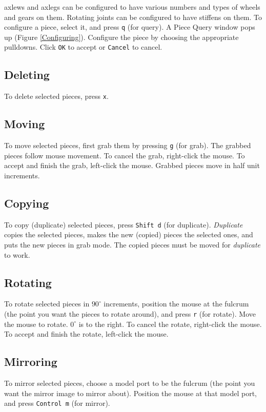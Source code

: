 \documentclass[12pt]{report}
\begin{document}
axlews and axlegs can be configured to have various numbers and types
of wheels and gears on them.  Rotating joints can be configured to
have stiffens on them.  To configure a piece, select it, and press
{\tt q} (for query).  A Piece Query window pops up (Figure
\ref{Configuring}).  Configure the piece by choosing the appropriate
pulldowns.  Click {\tt OK} to accept or {\tt Cancel} to cancel.

\subsection{Deleting}

To delete selected pieces, press {\tt x}.

\subsection{Moving}
To move selected pieces, first grab them by pressing {\tt g} (for
grab).  The grabbed pieces follow mouse movement.  To cancel the grab,
right-click the mouse.  To accept and finish the grab, left-click the
mouse.  Grabbed pieces move in half unit increments.

\subsection{Copying}
To copy (duplicate) selected pieces, press {\tt Shift d} (for
duplicate).  \emph{Duplicate} copies the selected pieces, makes the
new (copied) pieces the selected ones, and puts the new pieces in grab
mode.  The copied pieces must be moved for \emph{duplicate} to work.

\subsection{Rotating}
To rotate selected pieces in $90 ^\circ$ increments, position the
mouse at the fulcrum (the point you want the pieces to rotate around),
and press {\tt r} (for rotate).  Move the mouse to rotate.  $0 ^\circ$
is to the right.  To cancel the rotate, right-click the mouse.  To
accept and finish the rotate, left-click the mouse.

\subsection{Mirroring}
To mirror selected pieces, choose a model port to be the fulcrum (the
point you want the mirror image to mirror about).  Position the mouse
at that model port, and press {\tt Control m} (for mirror).
\end{document}
